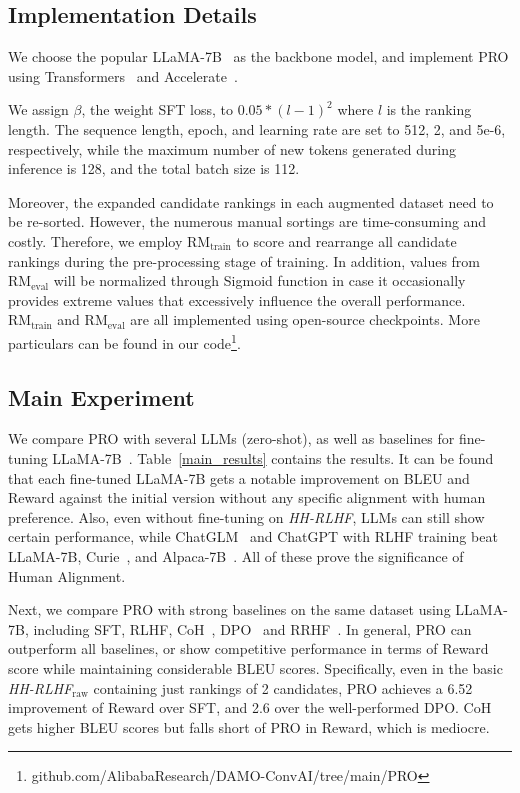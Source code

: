 \subsection{Implementation Details} We choose the popular LLaMA-7B~\cite{touvron2023llama} as the backbone model, and implement PRO using Transformers~\citep{wolf-etal-2020-transformers} and Accelerate~\citep{accelerate}. 

We assign $\beta$, the weight SFT loss, to $0.05*(l-1)^2$ where $l$ is the ranking length. The sequence length, epoch, and learning rate are set to 512, 2, and 5e-6, respectively, while the maximum number of new tokens generated during inference is 128, and the total batch size is 112. 

Moreover, the expanded candidate rankings in each augmented dataset need to be re-sorted. However, the numerous manual sortings are time-consuming and costly. Therefore, we employ $\text{RM}_{\text{train}}$ to score and rearrange all candidate rankings during the pre-processing stage of training. In addition, values from $\text{RM}_{\text{eval}}$ will be normalized through Sigmoid function in case it occasionally provides extreme values that excessively influence the overall performance. 
$\text{RM}_{\text{train}}$ and $\text{RM}_{\text{eval}}$ are all implemented using open-source checkpoints. More particulars can be found in our code\footnote{github.com/AlibabaResearch/DAMO-ConvAI/tree/main/PRO}.

\subsection{Main Experiment}
\label{subsec:res}
We compare PRO with several LLMs (zero-shot), as well as baselines for fine-tuning LLaMA-7B~\cite{touvron2023llama}. 
Table~\ref{main_results} contains the results. It can be found that each fine-tuned LLaMA-7B gets a notable improvement on BLEU and Reward against the initial version without any specific alignment with human preference. Also, even without fine-tuning on \textit{HH-RLHF}, LLMs can still show certain performance, while ChatGLM~\cite{du-etal-2022-glm} and ChatGPT with RLHF training beat LLaMA-7B, Curie~\cite{brown2020language}, and Alpaca-7B~\cite{alpaca}. All of these prove the significance of Human Alignment.

Next, we compare PRO with strong baselines on the same dataset using LLaMA-7B, including SFT, RLHF, CoH~\cite{liu2023languages}, DPO~\cite{rafailov2023direct} and RRHF~\cite{yuan2023rrhf}. In general, PRO can outperform all baselines, or show competitive performance in terms of Reward score while maintaining considerable BLEU scores. Specifically, even in the basic \textit{HH-RLHF}$_{\text{raw}}$ containing just rankings of 2 candidates, PRO achieves a 6.52 improvement of Reward over SFT, and 2.6 over the well-performed DPO. CoH~\cite{liu2023languages} gets higher BLEU scores but falls short of PRO in Reward, which is mediocre.

